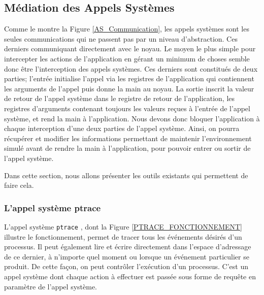 \subsection{Médiation des Appels Systèmes}

Comme le montre la Figure \ref{AS_Communication}, les appels systèmes sont les
seules communications qui ne passent pas par un niveau d'abstraction. Ces
derniers communiquant directement avec le noyau. Le moyen le plus simple pour
intercepter les actions de l'application en gérant un minimum de choses semble
donc être l'interception des appels systèmes. Ces derniers sont constitués de
deux parties; l'entrée initialise l'appel via les registres de l'application qui
contiennent les arguments de l'appel puis donne la main au noyau. La sortie
inscrit la valeur de retour de l'appel système dans le registre de retour de
l'application, les registres d'arguments contenant toujours les valeurs reçues à
l'entrée de l'appel système, et rend la main à l'application. Nous devons donc
bloquer l'application à chaque interception d'une deux parties de l'appel
système. Ainsi, on pourra récupérer et modifier les informations permettant de
maintenir l'environnement simulé avant de rendre la main à l'application, pour
pouvoir entrer ou sortir de l'appel système.

 Dans cette section, nous allons présenter les outils existants qui permettent
 de faire cela.
 
 \subsubsection{L'appel système ptrace}
 \label{subsection:ptrace}
               
L'appel système \texttt{ptrace} \citep{AS:Interception, MARION:Interception},
dont la Figure \ref{PTRACE_FONCTIONNEMENT} illustre le fonctionnement, permet de
tracer tous les événements désirés d'un processus. Il peut également lire et
écrire directement dans l'espace d'adressage de ce dernier, à n'importe quel
moment ou lorsque un événement particulier se produit. De cette façon, on peut
contrôler l'exécution d'un processus. C'est un appel système dont chaque action
à effectuer est passée sous forme de requête en paramètre de l'appel système.


